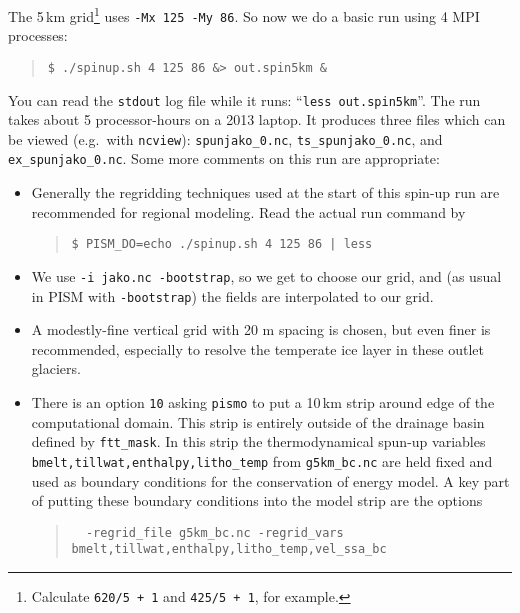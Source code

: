 The 5\,km grid\footnote{Calculate \texttt{620/5 + 1} and \texttt{425/5 + 1}, for example.} uses \texttt{-Mx 125 -My 86}.  So now we do a basic run using 4 MPI processes:
\begin{quote}\small
\begin{verbatim}
$ ./spinup.sh 4 125 86 &> out.spin5km &
\end{verbatim}
\normalsize\end{quote}
You can read the \texttt{stdout} log file while it runs: ``\texttt{less out.spin5km}''.  The run takes about 5 processor-hours on a 2013 laptop.   %
It produces three files which can be viewed (e.g.~with \texttt{ncview}): \texttt{spunjako_0.nc}, \texttt{ts_spunjako_0.nc}, and \texttt{ex_spunjako_0.nc}.  Some more comments on this run are appropriate:
\begin{itemize}
\item Generally the regridding techniques used at the start of this spin-up run are recommended for regional modeling.  Read the actual run command by
\begin{quote}\small
\begin{verbatim}
$ PISM_DO=echo ./spinup.sh 4 125 86 | less
\end{verbatim}
\normalsize\end{quote}
\item  We use \texttt{-i jako.nc -bootstrap}, so we get to choose our grid, and (as usual in PISM with \texttt{-bootstrap}) the fields are interpolated to our grid.
\item A modestly-fine vertical grid with 20 m spacing is chosen, but even finer is recommended, especially to resolve the temperate ice layer in these outlet glaciers.
\item There is an option  \texttt{10} asking \texttt{pismo} to put a 10\,km strip around edge of the computational domain.  This strip is entirely outside of the drainage basin defined by \texttt{ftt_mask}.  In this strip the thermodynamical spun-up variables \texttt{bmelt,tillwat,enthalpy,litho_temp} from \texttt{g5km_bc.nc} are held fixed and used as boundary conditions for the conservation of energy model.  A key part of putting these boundary conditions into the model strip are the options
\begin{quote}\small
\begin{verbatim}
  -regrid_file g5km_bc.nc -regrid_vars bmelt,tillwat,enthalpy,litho_temp,vel_ssa_bc
\end{verbatim}
\normalsize\end{quote}

\end{itemize}

